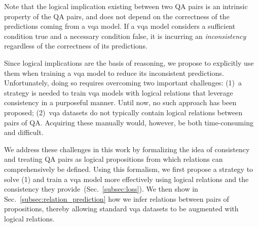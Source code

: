 Note that the logical implication existing between two QA pairs is an intrinsic property of the QA pairs, and does not depend on the correctness of the predictions coming from a \gls{vqa} model. If a \gls{vqa} model considers a sufficient condition true and a necessary condition false, it is incurring an \emph{inconsistency} regardless of the correctness of its predictions.

Since logical implications are the basis of reasoning, we propose to explicitly use them when training a \gls{vqa} model to reduce its inconsistent predictions.
Unfortunately, doing so requires overcoming two important challenges: (1)~a strategy is needed to train \gls{vqa} models with logical relations that leverage consistency in a purposeful manner. Until now, no such approach has been proposed; (2)~\gls{vqa} datasets do not typically contain logical relations between pairs of QA. Acquiring these manually would, however, be both time-consuming and difficult.

We address these challenges in this work by formalizing the idea of consistency and treating QA pairs as logical propositions from which relations can comprehensively be defined. Using this formalism, we first propose a strategy to solve (1) and train a \gls{vqa} model more effectively using logical relations and the consistency they provide~(Sec.~\ref{subsec:loss}). We then show in Sec.~\ref{subsec:relation_prediction} how we infer relations between pairs of propositions, thereby allowing standard \gls{vqa} datasets to be augmented with logical relations.





